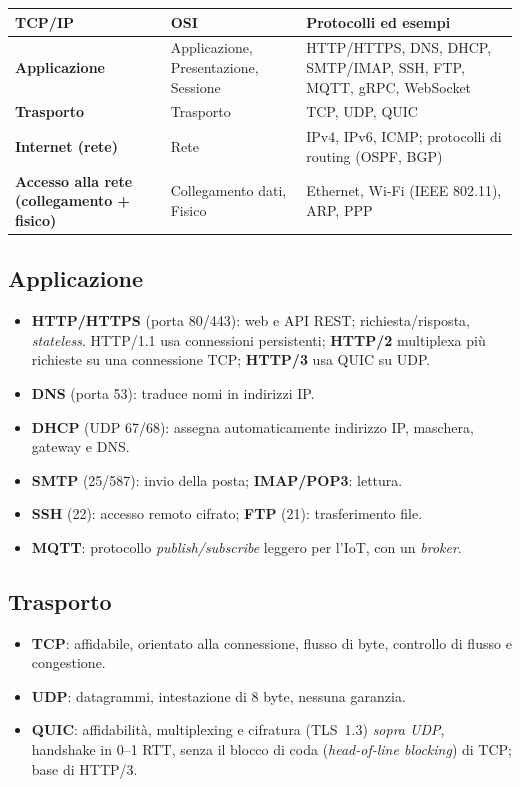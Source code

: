 \begin{center}
\small
\begin{tabularx}{\textwidth}{@{}>{\raggedright\arraybackslash}p{2.9cm}>{\raggedright\arraybackslash}p{2.8cm}X@{}}
\toprule
\textbf{TCP/IP} & \textbf{OSI} & \textbf{Protocolli ed esempi} \\
\midrule
\textbf{Applicazione} & Applicazione, Presentazione, Sessione & HTTP/HTTPS, DNS, DHCP, SMTP/IMAP, SSH, FTP, MQTT, gRPC, WebSocket \\
\textbf{Trasporto} & Trasporto & TCP, UDP, QUIC \\
\textbf{Internet (rete)} & Rete & IPv4, IPv6, ICMP; protocolli di routing (OSPF, BGP) \\
\textbf{Accesso alla rete (collegamento + fisico)} & Collegamento dati, Fisico & Ethernet, Wi-Fi (IEEE 802.11), ARP, PPP \\
\bottomrule
\end{tabularx}
\end{center}

\subsection{Applicazione}
\begin{itemize}
    \item \textbf{HTTP/HTTPS} (porta 80/443): web e API REST; richiesta/risposta, \emph{stateless}. HTTP/1.1 usa connessioni persistenti; \textbf{HTTP/2} multiplexa più richieste su una connessione TCP; \textbf{HTTP/3} usa QUIC su UDP.
    \item \textbf{DNS} (porta 53): traduce nomi in indirizzi IP.
    \item \textbf{DHCP} (UDP 67/68): assegna automaticamente indirizzo IP, maschera, gateway e DNS.
    \item \textbf{SMTP} (25/587): invio della posta; \textbf{IMAP/POP3}: lettura.
    \item \textbf{SSH} (22): accesso remoto cifrato; \textbf{FTP} (21): trasferimento file.
    \item \textbf{MQTT}: protocollo \emph{publish/subscribe} leggero per l'IoT, con un \emph{broker}.
\end{itemize}

\subsection{Trasporto}
\begin{itemize}
    \item \textbf{TCP}: affidabile, orientato alla connessione, flusso di byte, controllo di flusso e congestione.
    \item \textbf{UDP}: datagrammi, intestazione di 8 byte, nessuna garanzia.
    \item \textbf{QUIC}: affidabilità, multiplexing e cifratura (TLS~1.3) \emph{sopra UDP}, handshake in 0--1 RTT, senza il blocco di coda (\emph{head-of-line blocking}) di TCP; base di HTTP/3.
\end{itemize}

